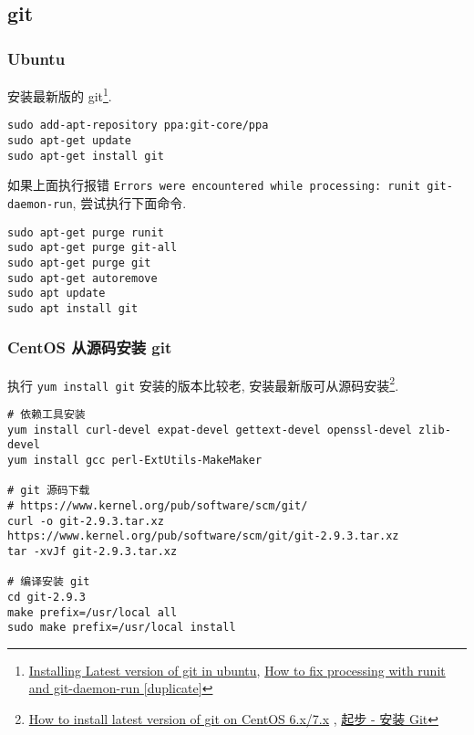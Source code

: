 \subsection{git}\label{git}

\subsubsection{Ubuntu}\label{ubuntu}

安装最新版的 git\footnote{\href{http://stackoverflow.com/questions/19109542/installing-latest-version-of-git-in-ubuntu/19109661\#19109661}{Installing
  Latest version of git in ubuntu},
  \href{http://askubuntu.com/questions/765565/how-to-fix-processing-with-runit-and-git-daemon-run/772095\#772095}{How
  to fix processing with runit and git-daemon-run {[}duplicate{]}}}.

\begin{lstlisting}
sudo add-apt-repository ppa:git-core/ppa
sudo apt-get update
sudo apt-get install git
\end{lstlisting}

如果上面执行报错
\lstinline!Errors were encountered while processing: runit git-daemon-run!,
尝试执行下面命令.

\begin{lstlisting}
sudo apt-get purge runit
sudo apt-get purge git-all
sudo apt-get purge git
sudo apt-get autoremove
sudo apt update
sudo apt install git
\end{lstlisting}

\subsubsection{CentOS 从源码安装
git}\label{centos-ux4eceux6e90ux7801ux5b89ux88c5-git}

执行 \lstinline!yum install git! 安装的版本比较老,
安装最新版可从源码安装\footnote{\href{http://stackoverflow.com/questions/21820715/how-to-install-latest-version-of-git-on-centos-6-x-7-x}{How
  to install latest version of git on CentOS 6.x/7.x} ,
  \href{https://git-scm.com/book/zh/v1/\%E8\%B5\%B7\%E6\%AD\%A5-\%E5\%AE\%89\%E8\%A3\%85-Git}{起步
  - 安装 Git}}.

\begin{lstlisting}
# 依赖工具安装
yum install curl-devel expat-devel gettext-devel openssl-devel zlib-devel
yum install gcc perl-ExtUtils-MakeMaker

# git 源码下载
# https://www.kernel.org/pub/software/scm/git/
curl -o git-2.9.3.tar.xz https://www.kernel.org/pub/software/scm/git/git-2.9.3.tar.xz
tar -xvJf git-2.9.3.tar.xz

# 编译安装 git
cd git-2.9.3
make prefix=/usr/local all
sudo make prefix=/usr/local install
\end{lstlisting}

